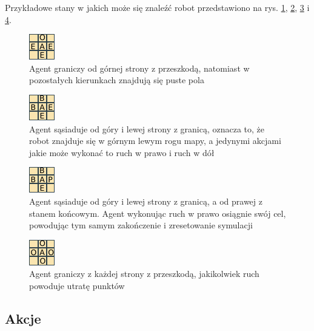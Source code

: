 Przykładowe stany w jakich może się znaleźć robot przedstawiono na rys. \ref{fig:grid1}, \ref{fig:grid2}, 
\ref{fig:grid3} i \ref{fig:grid4}.

\begin{figure}[H]
    \centering
    \includegraphics[scale=10]{grid1}
    \caption{Agent graniczy od górnej strony z przeszkodą, natomiast w pozostałych kierunkach znajdują się puste pola}
    \label{fig:grid1}
\end{figure}

\begin{figure}[H]
    \centering
    \includegraphics[scale=10]{grid2}
    \caption{Agent sąsiaduje od góry i lewej strony z granicą, oznacza to, że robot znajduje się w górnym lewym rogu 
mapy, a jedynymi akcjami jakie może wykonać to ruch w prawo i ruch w dół}
    \label{fig:grid2}
\end{figure}

\begin{figure}[H]
    \centering
    \includegraphics[scale=10]{grid3}
    \caption{Agent sąsiaduje od góry i lewej strony z granicą, a od prawej z stanem końcowym. Agent wykonując 
ruch w prawo osiągnie swój cel, powodując tym samym zakończenie i zresetowanie symulacji}
    \label{fig:grid3}
\end{figure}

\begin{figure}[H]
    \centering
    \includegraphics[scale=10]{grid4}
    \caption{Agent graniczy z każdej strony z przeszkodą, jakikolwiek ruch powoduje utratę punktów}
    \label{fig:grid4}
\end{figure}

\subsection{Akcje}
\label{subsec:akcje}

